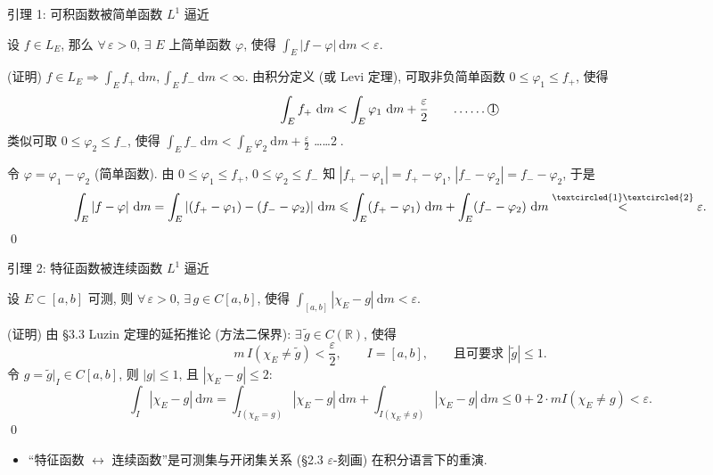 \begin{frame}{引理 1: 可积函数被简单函数 $L^1$ 逼近}

\begin{lem}
设 $f \in L_E$, 那么 $\forall\, \varepsilon > 0$, $\exists$ $E$ 上简单函数 $\varphi$, 使得
$\int_E |f - \varphi| ~ \mathrm{d} m < \varepsilon$.
\end{lem}

\startproof[bg=yellow, fg=red](证明)
$f \in L_E \Longrightarrow \int_E f_+ ~ \mathrm{d} m, \int_E f_- ~ \mathrm{d} m < \infty$.
由积分定义 (或 Levi 定理), 可取非负简单函数 $0 \leqslant \varphi_1 \leqslant f_+$, 使得
\[
\int_E f_+ ~ \mathrm{d} m < \int_E \varphi_1 ~ \mathrm{d} m + \frac{\varepsilon}{2}
\qquad \text{……\textcircled{1}}
\]
类似可取 $0 \leqslant \varphi_2 \leqslant f_-$, 使得
$\int_E f_- ~ \mathrm{d} m < \int_E \varphi_2 ~ \mathrm{d} m + \frac{\varepsilon}{2}$ ……\textcircled{2}.

\pause

令 $\varphi = \varphi_1 - \varphi_2$ (简单函数). 由 $0 \leqslant \varphi_1 \leqslant f_+$,
$0 \leqslant \varphi_2 \leqslant f_-$ 知 $|f_+ - \varphi_1| = f_+ - \varphi_1$,
$|f_- - \varphi_2| = f_- - \varphi_2$, 于是
\[
\int_E |f - \varphi| ~ \mathrm{d} m
= \int_E |(f_+ - \varphi_1) - (f_- - \varphi_2)| ~ \mathrm{d} m
\leqslant \int_E (f_+ - \varphi_1) ~ \mathrm{d} m + \int_E (f_- - \varphi_2) ~ \mathrm{d} m
\overset{\textcircled{1}\textcircled{2}}{<} \varepsilon .
\]
\qed

\end{frame}


\begin{frame}{引理 2: 特征函数被连续函数 $L^1$ 逼近}

\begin{lem}
设 $E \subset [a, b]$ 可测, 则 $\forall\, \varepsilon > 0$, $\exists\, g \in C[a, b]$, 使得
$\int_{[a,b]} |\chi_E - g| ~ \mathrm{d} m < \varepsilon$.
\end{lem}

\startproof[bg=yellow, fg=red](证明)
由 \S 3.3 Luzin 定理的\alert{延拓推论} (方法二保界): $\exists\, \tilde{g} \in C(\mathbb{R})$, 使得
\[
m\, I(\chi_E \neq \tilde{g}) < \frac{\varepsilon}{2}, \qquad I = [a, b],
\qquad \text{且可要求 } |\tilde{g}| \leqslant 1 .
\]
令 $g = \tilde{g}\big|_I \in C[a, b]$, 则 $|g| \leqslant 1$, 且 $|\chi_E - g| \leqslant 2$:
\[
\int_I |\chi_E - g| ~ \mathrm{d} m
= \int_{I(\chi_E = g)} |\chi_E - g| ~ \mathrm{d} m
+ \int_{I(\chi_E \neq g)} |\chi_E - g| ~ \mathrm{d} m
\leqslant 0 + 2 \cdot m I(\chi_E \neq g) < \varepsilon .
\]
\qed

\pause

\begin{itemize}
\item ``特征函数 $\leftrightarrow$ 连续函数''是可测集与开闭集关系 (\S 2.3 $\varepsilon$-刻画)
  在积分语言下的重演.
\end{itemize}

\end{frame}

